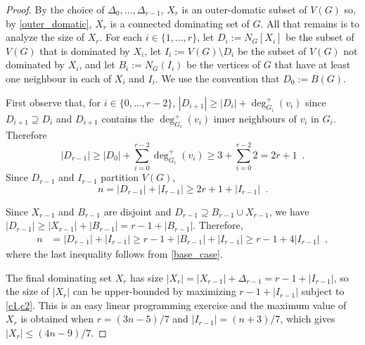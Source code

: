\documentclass[a4paper,UKenglish,cleveref, autoref, thm-restate]{lipics-v2021}
\begin{document}
\begin{proof}
By the choice of $\Delta_0,\ldots,\Delta_{r-1}$, $X_r$ is an outer-domatic subset of $V(G)$ so, by \cref{outer_domatic}, $X_r$ is a connected dominating set of $G$.  All that remains is to analyze the size of $X_r$.  For each $i\in\{1,\ldots,r\}$, let $D_i:=N_G[X_i]$ be the subset of $V(G)$ that is dominated by $X_i$, let $I_i:=V(G)\setminus D_i$ be the subset of $V(G)$ not dominated by $X_i$, and let $B_i:=N_G(I_i)$ be the vertices of $G$ that have at least one neighbour in each of $X_i$ and $I_i$.  We use the convention that $D_0:=B(G)$.

First observe that, for $i\in\{0,\ldots,r-2\}$, $|D_{i+1}|\ge |D_i|+\deg_{G_i}^+(v_i)$ since $D_{i+1}\supseteq D_i$ and $D_{i+1}$ contains the $\deg_{G_i}^+(v_i)$ inner neighbours of $v_i$ in $G_i$.  Therefore
\[
    |D_{r-1}| \ge |D_0| + \sum_{i=0}^{r-2} \deg_{G_i}^+(v_i) \ge 3 + \sum_{i=0}^{r-2} 2 =  2r+1 \enspace . \label{double_d}
\]
Since $D_{r-1}$ and $I_{r-1}$ partition $V(G)$,
\begin{equation}
  n = |D_{r-1}| + |I_{r-1}| \ge 2r+1 + |I_{r-1}|  \enspace . \label{c1}
\end{equation}

Since $X_{r-1}$ and $B_{r-1}$ are disjoint and $D_{r-1}\supseteq B_{r-1}\cup X_{r-1}$, we have $|D_{r-1}|\ge |X_{r-1}| + |B_{r-1}|=r-1+|B_{r-1}|$.  Therefore,
\begin{align}
    n & = |D_{r-1}| + |I_{r-1}| \ge r-1 + |B_{r-1}| + |I_{r-1}| \ge r - 1 + 4|I_{r-1}| \enspace , \label{c2}
\end{align}
where the last inequality follows from \cref{base_case}.

The final dominating set $X_r$ has size $|X_r| = |X_{r-1}| + \Delta_{r-1} = r - 1 +|I_{r-1}|$, so the size of $|X_r|$ can be upper-bounded by maximizing $r-1+|I_{r-1}|$ subject to \cref{c1,c2}.
This is an easy linear programming exercise and the maximum value of $X_{r}$ is obtained when $r=(3n-5)/7$ and $|I_{r-1}|=(n+3)/7$, which gives
$|X_r| \le (4n-9)/7$.
\end{proof}
\end{document}
